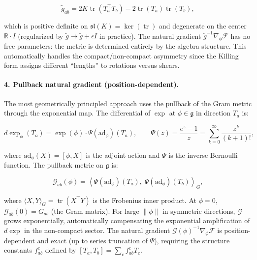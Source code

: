 \documentclass[twoside,11pt]{article}
\begin{document}
\begin{equation}
\tilde{g}_{ab} = 2K \operatorname{tr}(T_a^\top T_b) - 2\operatorname{tr}(T_a)\operatorname{tr}(T_b),
\label{eq:killing_metric}
\end{equation}

which is positive definite on $\mathfrak{sl}(K) = \ker(\operatorname{tr})$ and degenerate on the center $\mathbb{R} \cdot I$ (regularized by $\tilde{g} \to \tilde{g} + \epsilon I$ in practice). The natural gradient $\tilde{g}^{-1} \nabla_\phi \mathcal{F}$ has no free parameters: the metric is determined entirely by the algebra structure. This automatically handles the compact/non-compact asymmetry since the Killing form assigns different ``lengths'' to rotations versus shears.

\paragraph{4. Pullback natural gradient (position-dependent).}
The most geometrically principled approach uses the pullback of the Gram metric through the exponential map. The differential of $\exp$ at $\phi \in \mathfrak{g}$ in direction $T_a$ is:

\begin{equation}
d\exp_\phi(T_a) = \exp(\phi) \cdot \Psi(\mathrm{ad}_\phi)(T_a), \qquad \Psi(z) = \frac{e^z - 1}{z} = \sum_{k=0}^{\infty} \frac{z^k}{(k+1)!},
\end{equation}

where $\mathrm{ad}_\phi(X) = [\phi, X]$ is the adjoint action and $\Psi$ is the inverse Bernoulli function. The pullback metric on $\mathfrak{g}$ is:

\begin{equation}
\mathcal{G}_{ab}(\phi) = \left\langle \Psi(\mathrm{ad}_\phi)(T_a),\; \Psi(\mathrm{ad}_\phi)(T_b) \right\rangle_G,
\label{eq:pullback_metric}
\end{equation}

where $\langle X, Y \rangle_G = \operatorname{tr}(X^\top Y)$ is the Frobenius inner product. At $\phi = 0$, $\mathcal{G}_{ab}(0) = G_{ab}$ (the Gram matrix). For large $\|\phi\|$ in symmetric directions, $\mathcal{G}$ grows exponentially, automatically compensating the exponential amplification of $d\exp$ in the non-compact sector. The natural gradient $\mathcal{G}(\phi)^{-1} \nabla_\phi \mathcal{F}$ is position-dependent and exact (up to series truncation of $\Psi$), requiring the structure constants $f^c_{ab}$ defined by $[T_a, T_b] = \sum_c f^c_{ab} T_c$.
\end{document}
